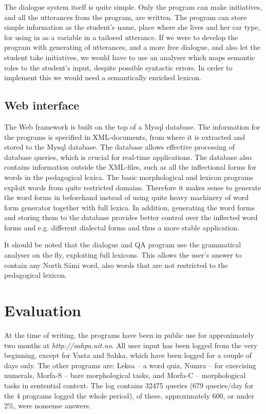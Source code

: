 \documentclass[11pt]{article}
\begin{document}
The dialogue system itself is quite simple. Only the program can make initiatives, and all the utterances from the program, are written. The program can store simple information as the student's name, place where she lives and her car type, for using in as a variable in a tailored utterance. If we were to develop the program with generating of utterances, and a more free dialogue, and also let the student take initiatives, we would have to use an analyser which maps semantic roles to the student's input, despite possible syntactic errors. In order to implement this we would need a semantically enriched lexicon.

\subsection{Web interface}

The Web framework is built on the top of a Mysql database. The information for the programs is specified in XML-documents, from where it is extracted and stored to the Mysql database. The database allows effective processing of database queries, which is crucial for real-time applications. The database also contains information outside the XML-files, such as all the inflectional forms for words in the pedagogical lexica. The basic morphological and lexicon programs exploit words from quite restricted domains. Therefore it makes sense to generate the word forms in beforehand instead of using quite heavy machinery of word form generator together with full lexica. In addition, generating the word forms and storing them to the database provides better control over the inflected word forms and e.g. different dialectal forms and thus a more stable application.

It should be noted that the dialogue and QA program use the grammatical analyser on the fly, exploiting full lexicons. This allows the user's answer to contain any North Sámi word, also words that are not restricted to the pedagogical lexicon.

\section{Evaluation}

At the time of writing, the programs have been in public use for approximately two months at \textit{http://oahpa.uit.no}. All user input has been logged from the very beginning, except for Vasta and Sahka, which have been logged for a couple of days only. The other programs are: Leksa -- a word quiz, Numra -- for exercising numerals, Morfa-S -- bare morphological tasks, and Morfa-C -- morphological tasks in sentential context. The log contains 32475 queries (679 queries/day for the 4 programs logged the whole period), of these, approximately 600, or under 2\%, were nonsense answers. %
\end{document}
